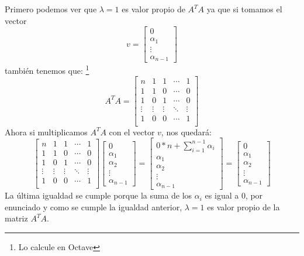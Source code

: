 \documentclass{article}
\begin{document}
Primero podemos ver que $\lambda=1$ es valor propio de $A^{T}A$ ya que si tomamos el vector 
$$v=
\begin{bmatrix}
0\\
\alpha_1\\
\vdots\\
\alpha_{n-1}
\end{bmatrix}
$$
también tenemos que:
\footnote{Lo calcule en Octave}
$$A^{T}A = 
\begin{bmatrix}
n&1&1&\cdots&1\\
1&1&0&\cdots&0\\
1&0&1&\cdots&0\\
\vdots&\vdots&\vdots&\ddots&\vdots\\
1&0&0&\cdots&1\\
\end{bmatrix} $$
Ahora si multiplicamos $A^{T}A$ con el vector $v$, nos quedará:
$$
\begin{bmatrix}
n&1&1&\cdots&1\\
1&1&0&\cdots&0\\
1&0&1&\cdots&0\\
\vdots&\vdots&\vdots&\ddots&\vdots\\
1&0&0&\cdots&1\\
\end{bmatrix}
\begin{bmatrix}
0\\
\alpha_1\\
\alpha_2\\
\vdots\\
\alpha_{n-1}
\end{bmatrix}
=
\begin{bmatrix}
0* n + \sum_{i=1}^{n-1}\alpha_i\\
\alpha_1\\
\alpha_2\\
\vdots\\
\alpha_{n-1}
\end{bmatrix}
=
\begin{bmatrix}
0\\
\alpha_1\\
\alpha_2\\
\vdots\\
\alpha_{n-1}
\end{bmatrix}
$$
La última igualdad se cumple porque la suma de los $\alpha_i$ es igual a $0$, por enunciado y como se cumple la igualdad anterior, $\lambda=1$ es valor propio de la matriz $A^{T}A$.\\
\end{document}
